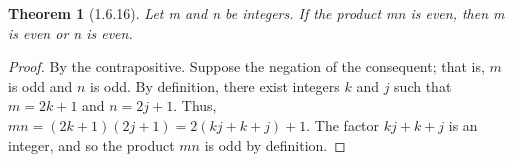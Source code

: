 \documentclass[a4paper, 12pt]{article}
\theoremstyle{plain}
\newtheorem*{theorem*}{Theorem}
\begin{document}
	
	\begin{theorem*}[1.6.16]
		Let m and n be integers. If the product mn is even, then m is even or n is even.
	\end{theorem*}
	
	\begin{proof}
		By the contrapositive. Suppose the negation of the consequent; that is, $m$ is odd and $n$ is odd. 
		By definition, there exist integers $k$ and $j$ such that $m = 2k + 1$ and $n = 2j + 1$. Thus, 
		$mn = (2k + 1)(2j + 1) = 2(kj + k + j) + 1$. The factor $kj + k + j$ is an integer, and so the 
		product $mn$ is odd by definition.
	\end{proof}
\end{document}
